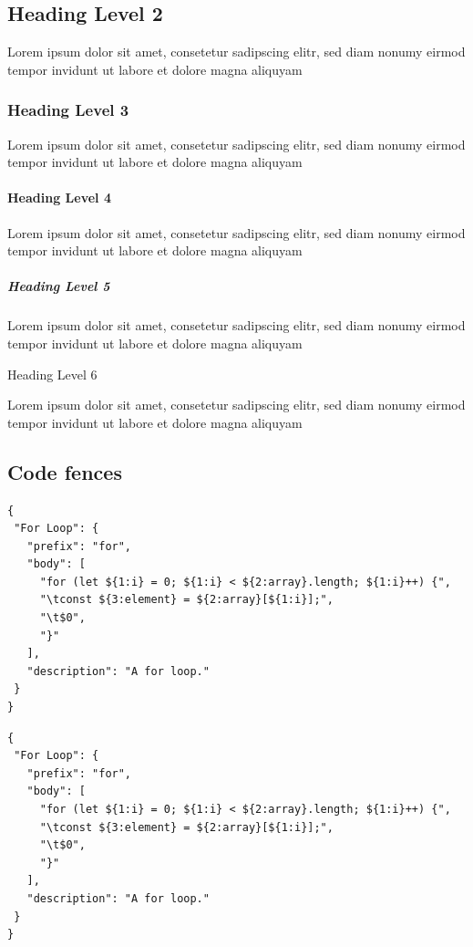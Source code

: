 \subsection{Heading Level 2}\label{heading-level-2}

Lorem ipsum dolor sit amet, consetetur sadipscing elitr, sed diam nonumy
eirmod tempor invidunt ut labore et dolore magna aliquyam

\subsubsection{Heading Level 3}\label{heading-level-3}

Lorem ipsum dolor sit amet, consetetur sadipscing elitr, sed diam nonumy
eirmod tempor invidunt ut labore et dolore magna aliquyam

\paragraph{Heading Level 4}\label{heading-level-4}

Lorem ipsum dolor sit amet, consetetur sadipscing elitr, sed diam nonumy
eirmod tempor invidunt ut labore et dolore magna aliquyam

\subparagraph{Heading Level 5}\label{heading-level-5}

Lorem ipsum dolor sit amet, consetetur sadipscing elitr, sed diam nonumy
eirmod tempor invidunt ut labore et dolore magna aliquyam

Heading Level 6

Lorem ipsum dolor sit amet, consetetur sadipscing elitr, sed diam nonumy
eirmod tempor invidunt ut labore et dolore magna aliquyam

\subsection{Code fences}\label{code-fences}

\begin{verbatim}
{
 "For Loop": {
   "prefix": "for",
   "body": [
     "for (let ${1:i} = 0; ${1:i} < ${2:array}.length; ${1:i}++) {",
     "\tconst ${3:element} = ${2:array}[${1:i}];",
     "\t$0",
     "}"
   ],
   "description": "A for loop."
 }
}
\end{verbatim}

\begin{tcolorbox}[breakable,colback=ocBluBack,colframe=ocBluFrame,coltitle=ocBluTitle,left=3mm,boxed title style={left=1mm},title={\hspace*{-2.5mm}\iconAddendum\; Addendum}]

\begin{verbatim}
{
 "For Loop": {
   "prefix": "for",
   "body": [
     "for (let ${1:i} = 0; ${1:i} < ${2:array}.length; ${1:i}++) {",
     "\tconst ${3:element} = ${2:array}[${1:i}];",
     "\t$0",
     "}"
   ],
   "description": "A for loop."
 }
}
\end{verbatim}

\end{tcolorbox}

